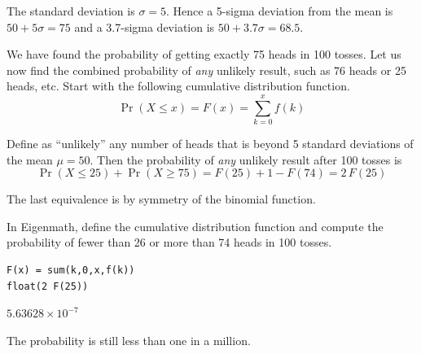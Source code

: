 The standard deviation is $\sigma=5$.
Hence a 5-sigma deviation from the mean is
$50+5\sigma=75$ and a
3.7-sigma deviation is $50+3.7\sigma=68.5$.

\bigskip
We have found the probability of getting exactly 75 heads in 100 tosses.
Let us now find the combined probability of \textit{any} unlikely result,
such as 76 heads or 25 heads, etc.
Start with the following cumulative distribution function.
\begin{equation*}
\Pr(X\le x)=F(x)=\sum_{k=0}^xf(k)
\end{equation*}

Define as ``unlikely'' any number of heads that is beyond 5 standard deviations of the
mean $\mu=50$.
Then the probability of \textit{any} unlikely result after 100 tosses is
\begin{equation*}
\Pr(X\le25)+\Pr(X\ge75)=F(25)+1-F(74)=2\,F(25)
\end{equation*}

The last equivalence is by symmetry of the binomial function.

\bigskip
In Eigenmath, define the cumulative distribution function and compute the probability
of fewer than 26 or more than 74 heads in 100 tosses.

{\color{blue}
\begin{verbatim}
F(x) = sum(k,0,x,f(k))
float(2 F(25))
\end{verbatim}}

$5.63628\times10^{-7}$

\bigskip
The probability is still less than one in a million.



